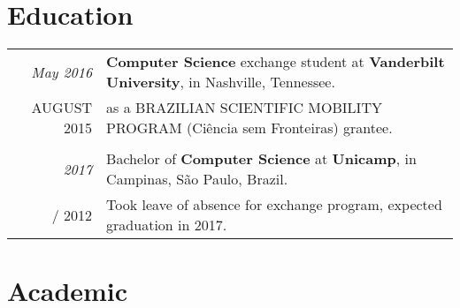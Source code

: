 \documentclass[a4paper,10pt]{article}
\makeatletter
\def\fakesc#1{%
  \begingroup%
  \xdef\fake@name{\csname\curr@fontshape/\f@size\endcsname}%
  \fontsize{\fontdimen8\fake@name}{\baselineskip}\selectfont%
  \uppercase{#1}%
  \endgroup%
}
\renewcommand{\textsc}{\fakesc}
\makeatother
\begin{document}
\section{Education}

\begin{tabularx}{\textwidth}{r|X}

  \emph{May 2016} & \textbf{Computer Science} exchange student at \textbf{Vanderbilt University}, in Nashville, Tennessee. \\
  \textsc{August 2015} & as a \textsc{Brazilian Scientific Mobility Program} {\footnotesize (Ciência sem Fronteiras)} grantee.  \\
  \multicolumn{2}{c}{}\\

  \emph{2017} & Bachelor of \textbf{Computer Science} at \textbf{Unicamp}, in Campinas, São Paulo, Brazil.\\
  \textsc{2012} & \footnotesize Took leave of absence for exchange program, expected graduation in 2017. \\

\end{tabularx}

\section{Academic}
\end{document}
